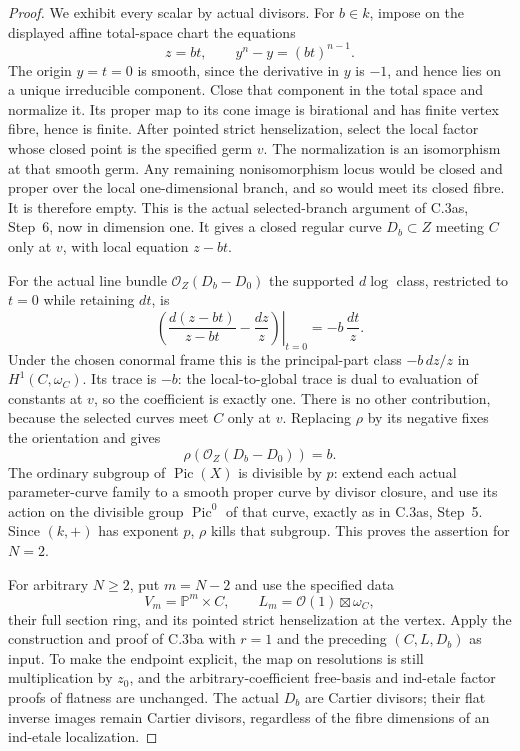 \begin{proof}
We exhibit every scalar by actual divisors. For $b\in k$, impose
on the displayed affine total-space chart the equations
\[
                   z=bt,\qquad y^n-y=(bt)^{n-1}.
\]
The origin $y=t=0$ is smooth, since the derivative in $y$ is
$-1$, and hence lies on a unique irreducible component. Close that
component in the total space and normalize it. Its proper map to
its cone image is birational and has finite vertex fibre, hence is
finite. After pointed strict henselization, select the local factor
whose closed point is the specified germ $v$. The normalization is
an isomorphism at that smooth germ. Any remaining nonisomorphism
locus would be closed and proper over the local one-dimensional
branch, and so would meet its closed fibre. It is therefore empty.
This is the actual selected-branch argument of C.3as, Step~6, now
in dimension one. It gives a closed regular curve $D_b\subset Z$
meeting $C$ only at $v$, with local equation $z-bt$.

For the actual line bundle $\mathcal O_Z(D_b-D_0)$ the supported
$d\log$ class, restricted to $t=0$ while retaining $dt$, is
\[
 \left.\left(\frac{d(z-bt)}{z-bt}-\frac{dz}{z}\right)\right|_{t=0}
                          =-b\,\frac{dt}{z}.
\]
Under the chosen conormal frame this is the principal-part class
$-b\,dz/z$ in $H^1(C,\omega_C)$. Its trace is $-b$: the
local-to-global trace is dual to evaluation of constants at $v$,
so the coefficient is exactly one. There is no other contribution,
because the selected curves meet $C$ only at $v$. Replacing $\rho$
by its negative fixes the orientation and gives
\[
                      \rho(\mathcal O_Z(D_b-D_0))=b.
\]
The ordinary subgroup of $\operatorname{Pic}(X)$ is divisible by
$p$: extend each actual parameter-curve family to a smooth proper
curve by divisor closure, and use its action on the divisible group
$\operatorname{Pic}^0$ of that curve, exactly as in C.3as, Step~5.
Since $(k,+)$ has exponent $p$, $\rho$ kills that subgroup. This
proves the assertion for $N=2$.

For arbitrary $N\ge2$, put $m=N-2$ and use the specified data
\[
                 V_m=\mathbb P^m\times C,\qquad
                 L_m=\mathcal O(1)\boxtimes\omega_C,
\]
their full section ring, and its pointed strict henselization at the
vertex. Apply the construction and proof of C.3ba with $r=1$ and
the preceding $(C,L,D_b)$ as input. To make the endpoint explicit,
the map on resolutions is still multiplication by $z_0$, and the
arbitrary-coefficient free-basis and ind-etale factor proofs of
flatness are unchanged. The actual $D_b$ are Cartier divisors;
their flat inverse images remain Cartier divisors, regardless of
the fibre dimensions of an ind-etale localization.


\end{proof}
